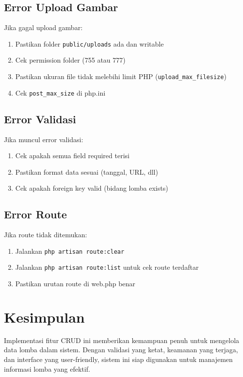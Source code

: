 \documentclass[12pt,a4paper]{article}
\begin{document}
\subsection{Error Upload Gambar}

Jika gagal upload gambar:
\begin{enumerate}
    \item Pastikan folder \texttt{public/uploads} ada dan writable
    \item Cek permission folder (755 atau 777)
    \item Pastikan ukuran file tidak melebihi limit PHP (\texttt{upload\_max\_filesize})
    \item Cek \texttt{post\_max\_size} di php.ini
\end{enumerate}

\subsection{Error Validasi}

Jika muncul error validasi:
\begin{enumerate}
    \item Cek apakah semua field required terisi
    \item Pastikan format data sesuai (tanggal, URL, dll)
    \item Cek apakah foreign key valid (bidang lomba exists)
\end{enumerate}

\subsection{Error Route}

Jika route tidak ditemukan:
\begin{enumerate}
    \item Jalankan \texttt{php artisan route:clear}
    \item Jalankan \texttt{php artisan route:list} untuk cek route terdaftar
    \item Pastikan urutan route di web.php benar
\end{enumerate}

\section{Kesimpulan}

Implementasi fitur CRUD ini memberikan kemampuan penuh untuk mengelola data lomba dalam sistem. Dengan validasi yang ketat, keamanan yang terjaga, dan interface yang user-friendly, sistem ini siap digunakan untuk manajemen informasi lomba yang efektif.
\end{document}
